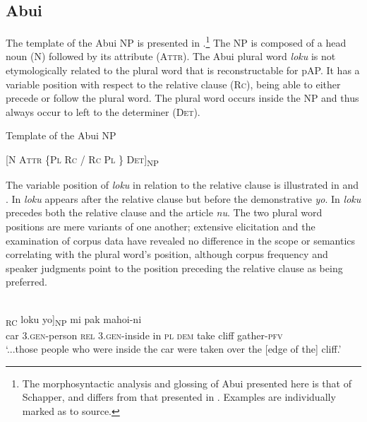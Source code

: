 \subsection{Abui} %
\label{sec:9:3.4}
The template of the Abui NP is presented in .\footnote{  The morphosyntactic analysis and glossing of Abui presented here is that of Schapper, and differs from that presented in \citet{Kratochvil2007}. Examples are individually marked as to source.} The NP is composed of a head noun (N) followed by its attribute (\textsc{Attr).} The Abui plural word \textit{loku} is not etymologically related to the plural word that is reconstructable for pAP. It has a variable position with respect to the relative clause (\textsc{Rc}), being able to either precede or follow the plural word. The plural word occurs inside the NP and thus always occur to left to the determiner (\textsc{Det).}

\ea%
\label{ex:9:46}
\upshape 
 Template of the Abui NP

[\textsc{N  Attr  \{Pl  Rc  /  Rc  Pl \} Det}]\textsubscript{NP}
\z

The variable position of \textit{loku} in relation to the relative clause is illustrated in  and . In  \textit{loku} appears after the relative clause but before the demonstrative \textit{yo}. In  \textit{loku} precedes both the relative clause and the article \textit{nu}. The two plural word positions are mere variants of one another; extensive elicitation and the examination of corpus data have revealed no difference in the scope or semantics correlating with the plural word's position, although corpus frequency and speaker judgments point to the position preceding the relative clause as being preferred.


\ea%
\label{ex:9:47}
 \\
\gll  [...oto he-amakaang [{ba} h-omi {mia}]\textsubscript{RC} loku yo]\textsubscript{NP}  mi pak mahoi-ni \\
  car \textsc{3.gen}-person \textsc{rel} \textsc{3.gen}-inside in \textsc{pl} \textsc{dem}   take cliff gather-\textsc{pfv}  \\
\glt `...those people who were inside the car were taken over the [edge of the] cliff.'
\z
 

